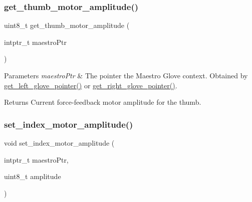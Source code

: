 \subsubsection{\texorpdfstring{get\+\_\+thumb\+\_\+motor\+\_\+amplitude()}{get\_thumb\_motor\_amplitude()}}
{\footnotesize\ttfamily uint8\+\_\+t get\+\_\+thumb\+\_\+motor\+\_\+amplitude (\begin{DoxyParamCaption}\item[{intptr\+\_\+t}]{maestro\+Ptr }\end{DoxyParamCaption})}


\begin{DoxyParams}{Parameters}
{\em maestro\+Ptr} & The pointer the Maestro Glove context. Obtained by \hyperlink{group__glove_management_ga63ce3c99d4a8b8db851b22af9185764e}{get\+\_\+left\+\_\+glove\+\_\+pointer()} or \hyperlink{group__glove_management_ga9b8fd9d91aeac3f8da50f7a7eba0c32b}{get\+\_\+right\+\_\+glove\+\_\+pointer()}. \\
\hline
\end{DoxyParams}
\begin{DoxyReturn}{Returns}
Current force-\/feedback motor amplitude for the thumb. 
\end{DoxyReturn}
\mbox{\label{group__force_feedback_control_gae4b41d284100a6b343cd684ecd2d06a3}} 
\subsubsection{\texorpdfstring{set\+\_\+index\+\_\+motor\+\_\+amplitude()}{set\_index\_motor\_amplitude()}}
{\footnotesize\ttfamily void set\+\_\+index\+\_\+motor\+\_\+amplitude (\begin{DoxyParamCaption}\item[{intptr\+\_\+t}]{maestro\+Ptr,  }\item[{uint8\+\_\+t}]{amplitude }\end{DoxyParamCaption})}

